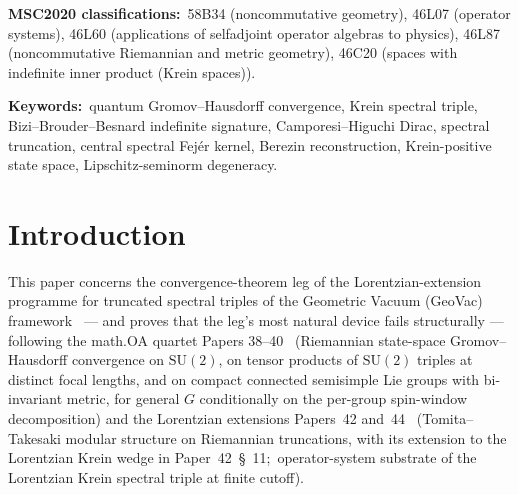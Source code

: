 \documentclass[11pt,a4paper]{article}
\theoremstyle{plain}
\theoremstyle{definition}
\newcommand{\nmax}{n_{\max}}
\newcommand{\SU}{\mathrm{SU}}
\newcommand{\DGV}{D_{\mathrm{GV}}}
\newcommand{\DL}{D_{L}}
\newcommand{\JL}{J_{L}}
\begin{document}
\begin{abstract}
identity $[\DL, a_{s} \otimes a_{t}] = i[\DGV, a_{s}] \otimes a_{t}$,
which is precisely the diagnosis that the momentum-diagonal temporal
algebra is metrically invisible;\ and a spatial convergence statement
(Proposition~\ref{prop:spatial_conditional}):\ the spatial truncations
converge in van~Suijlekom's state-space Gromov--Hausdorff
distance~\cite{vs2021_jgp,gaudillot_vs2023} at the companion-paper
rate $O(\log\nmax/\nmax)$ --- unconditional, via the companion paper's
translation-seminorm theorem --- with the temporal factor a metrically
invisible spectator carried $\JL$-equivariantly. The genuine
Lorentzian/Krein quantum-metric convergence problem --- a temporal
multiplier algebra the Dirac can see (Toeplitz compressions of
$e^{iqt}$) and a Krein-compatible Lipschitz seminorm that does not
compress $\DL$ --- is stated as an open target with a sharpened
specification (\S~\ref{sec:open}). An earlier draft of this paper
claimed a convergence theorem through the compression device;\ that
claim is retracted (Remark~\ref{rem:history}).
\end{abstract}

\bigskip\noindent
\textbf{MSC2020 classifications:}\ 58B34 (noncommutative geometry),
46L07 (operator systems), 46L60 (applications of selfadjoint operator
algebras to physics), 46L87 (noncommutative Riemannian and metric
geometry), 46C20 (spaces with indefinite inner product (Krein spaces)).

\medskip\noindent
\textbf{Keywords:}\ quantum Gromov--Hausdorff convergence, Krein
spectral triple, Bizi--Brouder--Besnard indefinite signature,
Camporesi--Higuchi Dirac, spectral truncation, central spectral
Fej\'er kernel, Berezin reconstruction, Krein-positive state space,
Lipschitz-seminorm degeneracy.

\section{Introduction}\label{sec:intro}

This paper concerns the convergence-theorem leg of the
Lorentzian-extension programme for truncated spectral triples of the
Geometric Vacuum (GeoVac) framework~\cite{paper32} --- and proves
that the leg's most natural device fails structurally --- following the math.OA quartet Papers
38--40~\cite{paper38,paper39,paper40_unified} (Riemannian state-space
Gromov--Hausdorff convergence on $\SU(2)$, on tensor products of $\SU(2)$ triples at
distinct focal lengths, and on compact connected semisimple Lie groups
with bi-invariant metric, for general $G$ conditionally on the per-group
spin-window decomposition) and the Lorentzian extensions
Papers~42 and~44~\cite{paper42,paper44} (Tomita--Takesaki modular
structure on Riemannian truncations, with its extension to the
Lorentzian Krein wedge in Paper~42~\S~11;\ operator-system
substrate of the Lorentzian Krein spectral triple at finite cutoff).
\end{document}
